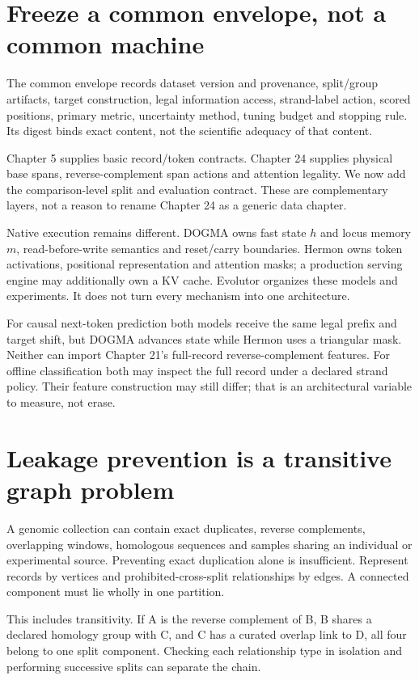 \section{Freeze a common envelope, not a common machine}
The common envelope records dataset version and provenance, split/group artifacts,
target construction, legal information access, strand-label action, scored
positions, primary metric, uncertainty method, tuning budget and stopping rule.
Its digest binds exact content, not the scientific adequacy of that content.

Chapter 5 supplies basic record/token contracts. Chapter 24 supplies physical
base spans, reverse-complement span actions and attention legality. We now add
the comparison-level split and evaluation contract. These are complementary
layers, not a reason to rename Chapter 24 as a generic data chapter.

Native execution remains different. DOGMA owns fast state $h$ and locus memory
$m$, read-before-write semantics and reset/carry boundaries. Hermon owns token
activations, positional representation and attention masks; a production serving
engine may additionally own a KV cache. Evolutor organizes these models and
experiments. It does not turn every mechanism into one architecture.


For causal next-token prediction both models receive the same legal prefix and
target shift, but DOGMA advances state while Hermon uses a triangular mask.
Neither can import Chapter 21's full-record reverse-complement features.
For offline classification both may inspect the full record under a declared
strand policy. Their feature construction may still differ; that is an
architectural variable to measure, not erase.

\section{Leakage prevention is a transitive graph problem}
A genomic collection can contain exact duplicates, reverse complements,
overlapping windows, homologous sequences and samples sharing an individual
or experimental source. Preventing exact duplication alone is insufficient.
Represent records by vertices and prohibited-cross-split relationships by
edges. A connected component must lie wholly in one partition.

This includes transitivity. If A is the reverse complement of B, B shares
a declared homology group with C, and C has a curated overlap link to D,
all four belong to one split component. Checking each relationship type
in isolation and performing successive splits can separate the chain.


